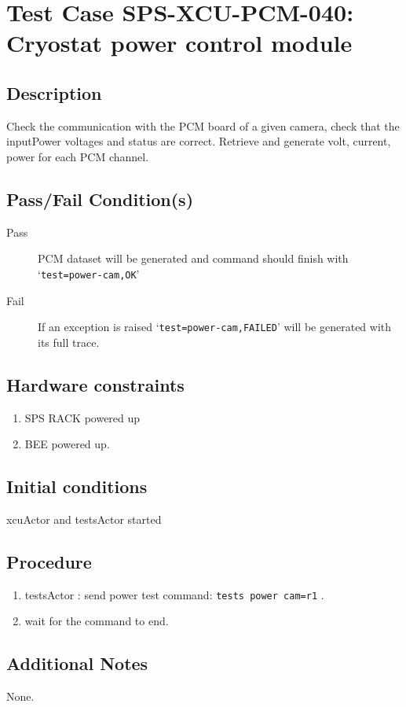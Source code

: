 \section{Test Case SPS-XCU-PCM-040: Cryostat power control module}

\subsection{Description}

Check the communication with the PCM board of a given camera, check that the inputPower voltages and status are correct.
Retrieve and generate volt, current, power for each PCM channel.

\subsection{Pass/Fail Condition(s)}

\begin{description}
\item [Pass] PCM dataset will be generated and command should finish with `\texttt{test=power-cam,OK}'
\item [Fail] If an exception is raised `\texttt{test=power-cam,FAILED}' will be generated with its full trace.

\end{description}

\subsection{Hardware constraints}

\begin{enumerate}
    \item SPS RACK powered up
    \item \acrshort{BEE} powered up.
\end{enumerate}

\subsection{Initial conditions}

xcuActor and testsActor started

\subsection{Procedure}

\begin{enumerate}
    \item testsActor : send power test command: \texttt{tests power cam=r1} .
    \item wait for the command to end.
\end{enumerate}

\subsection{Additional Notes}
None.
